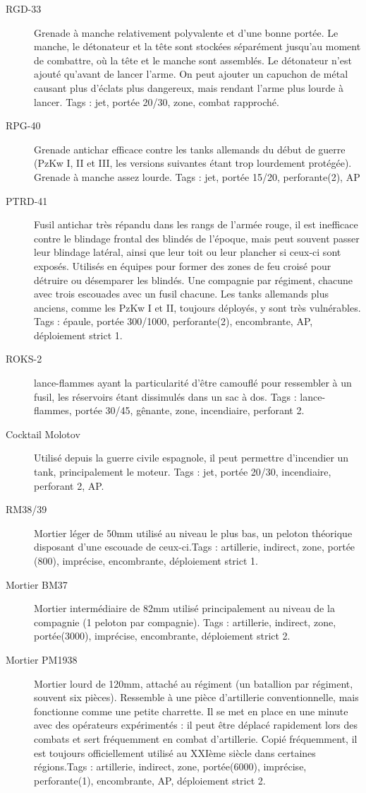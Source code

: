 \documentclass{report}
\begin{document}
\begin{multicols}{2}
\begin{description}
\item[RGD-33] Grenade à manche relativement polyvalente et d'une bonne portée. Le manche, le détonateur et la tête sont stockées séparément jusqu'au moment de combattre, où la tête et le manche sont assemblés. Le détonateur n'est ajouté qu'avant de lancer l'arme. On peut ajouter un capuchon de métal causant plus d'éclats plus dangereux, mais rendant l'arme plus lourde à lancer. Tags : jet, portée 20/30, zone, combat rapproché.
\item[RPG-40] Grenade antichar efficace contre les tanks allemands du début de guerre (PzKw I, II et III, les versions suivantes étant trop lourdement protégée). Grenade à manche assez lourde. Tags : jet, portée 15/20, perforante(2), AP
\item[PTRD-41]Fusil antichar très répandu dans les rangs de l'armée rouge, il est inefficace contre le blindage frontal des blindés de l'époque, mais peut souvent passer leur blindage latéral, ainsi que leur toit ou leur plancher si ceux-ci sont exposés. Utilisés en équipes pour former des zones de feu croisé pour détruire ou désemparer les blindés. Une compagnie par régiment, chacune avec trois escouades avec un fusil chacune. Les tanks allemands plus anciens, comme les PzKw I et II, toujours déployés, y sont très vulnérables. Tags : épaule, portée 300/1000, perforante(2), encombrante, AP, déploiement strict 1.
\item[ROKS-2] lance-flammes ayant la particularité d'être camouflé pour ressembler à un fusil, les réservoirs étant dissimulés dans un sac à dos. Tags : lance-flammes, portée 30/45, gênante, zone, incendiaire, perforant 2.
\item[Cocktail Molotov]Utilisé depuis la guerre civile espagnole, il peut permettre d'incendier un tank, principalement le moteur.  Tags : jet, portée 20/30, incendiaire, perforant 2, AP.
\item[RM38/39] Mortier léger de 50mm utilisé au niveau le plus bas, un peloton théorique disposant d'une escouade de ceux-ci.Tags : artillerie, indirect, zone, portée (800), imprécise, encombrante, déploiement strict 1.
\item[Mortier BM37] Mortier intermédiaire de 82mm utilisé principalement au niveau de la compagnie (1 peloton par compagnie). Tags : artillerie, indirect, zone, portée(3000), imprécise, encombrante, déploiement strict 2.
\item[Mortier PM1938]Mortier lourd de 120mm, attaché au régiment (un batallion par régiment, souvent six pièces). Ressemble à une pièce d'artillerie conventionnelle, mais fonctionne comme une petite charrette. Il se met en place en une minute avec des opérateurs expérimentés : il peut être déplacé rapidement lors des combats et sert fréquemment en combat d'artillerie. Copié fréquemment, il est toujours officiellement utilisé au XXIème siècle dans certaines régions.Tags : artillerie, indirect, zone, portée(6000), imprécise, perforante(1), encombrante, AP, déploiement strict 2.

\end{description}
\end{multicols}
\end{document}
